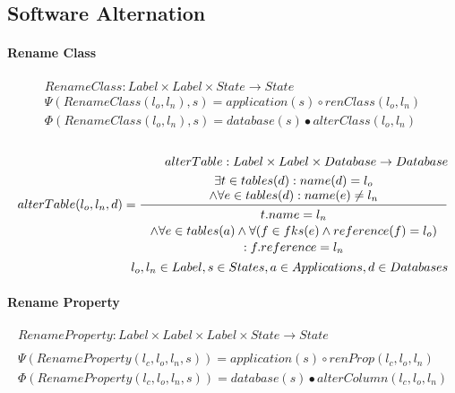 \documentclass[11pt]{article}
\begin{document}
\subsection{Software Alternation}
\paragraph{Rename Class}
\begin{align*}
RenameClass : Label \times Label \times State \rightarrow State \\ 
\Psi(RenameClass(l_o, l_n), s) = application(s) \circ renClass(l_o, l_n) \\
\Phi(RenameClass(l_o, l_n), s) = database(s) \bullet alterClass(l_o, l_n) \\ \\
\end{align*}

\begin{align*}
alterTable:  Label \times Label \times Database \rightarrow Database \\
alterTable(l_o, l_n, d) = \inference{\exists t \in tables(d) : name(d) = l_o \\ \wedge \forall e \in tables(d) : name(e) \neq l_n}{\begin{gathered}
t.name = l_n \\ \wedge \forall e \in tables(a) \wedge \forall (f \in fks(e) \wedge reference(f) = l_o ) \\ : f.reference = l_n 
\end{gathered}}\\
l_o, l_n \in Label, s \in States, a \in Applications, d \in Databases
\end{align*}

\paragraph{Rename Property}
\begin{align*}
	RenameProperty : Label \times Label \times Label \times State \rightarrow State \\ \\
\Psi(RenameProperty(l_c, l_o, l_n, s)) = application(s) \circ renProp(l_c, l_o, l_n) \\
\Phi(RenameProperty(l_c, l_o, l_n, s)) = database(s) \bullet alterColumn(l_c, l_o, l_n) \\\\
\end{align*}
\end{document}
